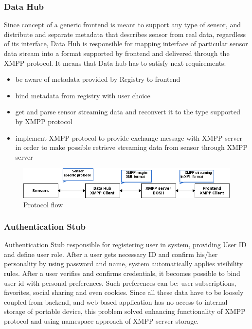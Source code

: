 	\subsubsection{Data Hub}
  Since concept of a generic frontend is meant to support any type of sensor, and distribute and separate metadata that describes sensor from real data, regardless of its interface, Data Hub is responsible for mapping interface of particular sensor data stream into a format supported by frontend and delivered through the XMPP protocol. It means that Data hub has to satisfy next requirements:

  \begin{itemize}
  \item be aware of metadata provided by Registry to frontend
  \item bind metadata from registry with user choice
  \item get and parse sensor streaming data and reconvert it to the type supported by XMPP protocol
  \item implement XMPP protocol to provide exchange message with XMPP server in order to make possible retrieve streaming data from sensor through XMPP server

  \end{itemize}
    \begin{figure}[!ht]
    \centering
    \includegraphics[scale=0.5]{images/Protocol_flow.png}   
    \caption[Protocol flow]{Protocol flow}
    \label{img:protocol}                           
    \end{figure}
  
    \subsubsection{Authentication Stub}
    Authentication Stub responsible for registering user in system, providing User ID and define user role. After a user gets necessary ID and confirm his/her personality by using password and name, system automatically applies visibility rules. After a user verifies and confirms credentials, it becomes possible to bind user id with personal preferences. Such preferences can be: user subscriptions, favorites, social sharing and even cookies. Since all these data have to be loosely coupled from backend, and web-based application has no access to internal storage of portable device, this problem solved enhancing functionality of XMPP protocol and using namespace approach of XMPP server storage.

